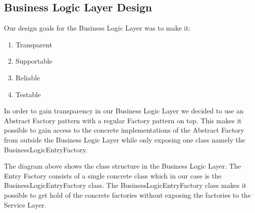 \documentclass[../report.tex]{subfiles}
\begin{document}
\graphicspath{{img/}{../img/}}

\subsection{Business Logic Layer Design}

Our design goals for the Business Logic Layer was to make it:
\begin{enumerate}
\item Transparent
\item Supportable
\item Reliable
\item Testable
\end{enumerate}

In order to gain transparency in our Business Logic Layer we decided to use an Abstract Factory pattern with a regular Factory pattern on top. This makes it possible to gain access to the concrete implementations of the Abstract Factory from outside the Business Logic Layer while only exposing one class namely the BusinessLogicEntryFactory.


The diagram above shows the class structure in the Business Logic Layer. The Entry Factory consists of a single concrete class which in our case is the BusinessLogicEntryFactory class. The BusinessLogicEntryFactory class makes it possible to get hold of the concrete factories without exposing the factories to the Service Layer.
\end{document}
